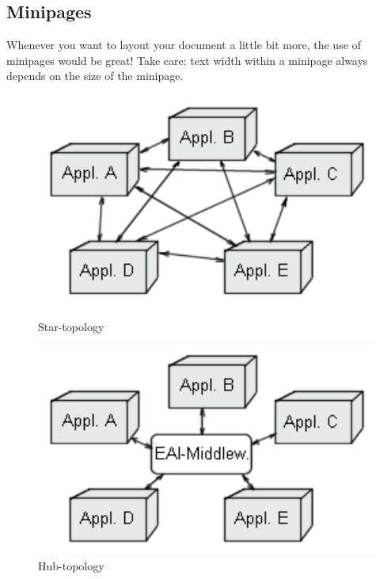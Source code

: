 \documentclass[12pt]{article}
\begin{document}
\subsection{Minipages}
Whenever you want to layout your document a little bit more, the use of minipages would be great!
Take care: text width within a minipage always depends on the size of the minipage.
\begin{figure}[here!]
\centering
\begin{minipage}[h]{0.3\textwidth}
\centering
    \includegraphics[width=1.0\textwidth]{images/eai0.png}
    \caption{Star-topology}
    \label{fig:eai0}
\end{minipage}
\begin{minipage}[h]{0.3\textwidth}
\centering
    \includegraphics[width=1.0\textwidth]{images/eai1.png}
    \caption{Hub-topology}
    \label{fig:eai1}
\end{minipage}
\begin{minipage}[h]{0.3\textwidth}
\centering

\end{minipage}
\end{figure}
\end{document}
